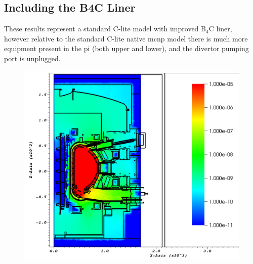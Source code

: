 \documentclass[12pt]{article}
\begin{document}
\subsection{Including the B4C Liner}
These results represent a standard C-lite model with improved B$_4$C liner,
however relative to the standard C-lite native \gls{mcnp} model there is much more
equipment present in the \gls{pi} (both upper and lower), and the divertor
pumping port is unplugged. 
\begin{figure}[ht!]
  \centering
  \includegraphics[scale=0.35]{../plots/neutron/b4c/flux_y0.png}     

\end{figure}
\end{document}
